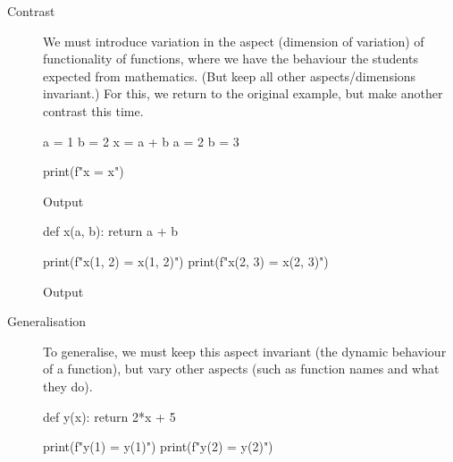 \begin{description}
  \item [Contrast] We must introduce variation in the aspect (dimension of 
    variation) of functionality of functions, where we have the behaviour the 
    students expected from mathematics.
    (But keep all other aspects/dimensions invariant.)
    For this, we return to the original example, but make another contrast this 
    time.

    \begin{frame}[fragile]
    \begin{minipage}[t]{0.45\columnwidth}
      \begin{pyblock}[funcC1][highlightlines=3]
a = 1
b = 2
x = a + b
a = 2
b = 3

print(f"x = {x}")
      \end{pyblock}

      \begin{block}{Output}\printpythontex[verbatim]\end{block}
    \end{minipage}
    \hfill
    \begin{minipage}[t]{0.45\columnwidth}
      \begin{pyblock}[funcC2][highlightlines={1-2}]
def x(a, b):
  return a + b



print(f"x(1, 2) = {x(1, 2)}")
print(f"x(2, 3) = {x(2, 3)}")
      \end{pyblock}

      \begin{block}{Output}\printpythontex[verbatim]\end{block}
    \end{minipage}
    \end{frame}

  \item[Generalisation] To generalise, we must keep this aspect invariant (the 
    dynamic behaviour of a function), but vary other aspects (such as function 
    names and what they do).

    \begin{frame}[fragile]
    \begin{minipage}[t]{0.45\columnwidth}
      \begin{pyblock}[funcG1]
def y(x):
  return 2*x + 5

print(f"y(1) = {y(1)}")
print(f"y(2) = {y(2)}")
      \end{pyblock}


\end{minipage}
\end{frame}
\end{description}

